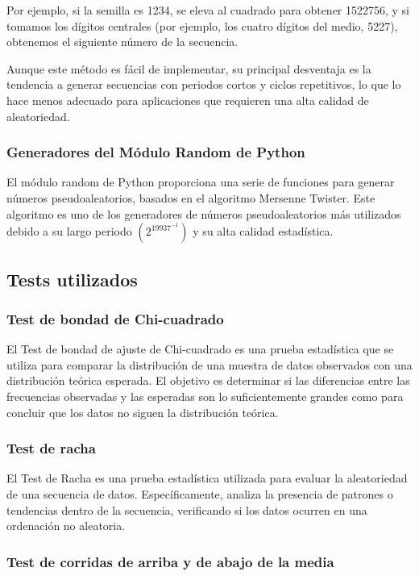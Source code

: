 \documentclass{article}
\begin{document}
Por ejemplo, si la semilla es 1234, se eleva al cuadrado para obtener 1522756, y si tomamos los dígitos centrales (por ejemplo, los cuatro dígitos del medio, 5227), obtenemos el siguiente número de la secuencia.

Aunque este método es fácil de implementar, su principal desventaja es la tendencia a generar secuencias con periodos cortos y ciclos repetitivos, lo que lo hace menos adecuado para aplicaciones que requieren una alta calidad de aleatoriedad.

\subsubsection{Generadores del Módulo Random de Python}

El módulo random de Python proporciona una serie de funciones para generar números pseudoaleatorios, basados en el algoritmo Mersenne Twister. Este algoritmo es uno de los generadores de números pseudoaleatorios más utilizados debido a su largo periodo $(2^{19937^{-1}})$ y su alta calidad estadística.

\subsection{Tests utilizados}

\subsubsection{Test de bondad de Chi-cuadrado}

El Test de bondad de ajuste de Chi-cuadrado es una prueba estadística que se utiliza para comparar la distribución de una muestra de datos observados con una distribución teórica esperada. El objetivo es determinar si las diferencias entre las frecuencias observadas y las esperadas son lo suficientemente grandes como para concluir que los datos no siguen la distribución teórica.

\subsubsection{Test de racha}

El Test de Racha es una prueba estadística utilizada para evaluar la aleatoriedad de una secuencia de datos. Específicamente, analiza la presencia de patrones o tendencias dentro de la secuencia, verificando si los datos ocurren en una ordenación no aleatoria.


\subsubsection{Test de corridas de arriba y de abajo de la media}
\end{document}
